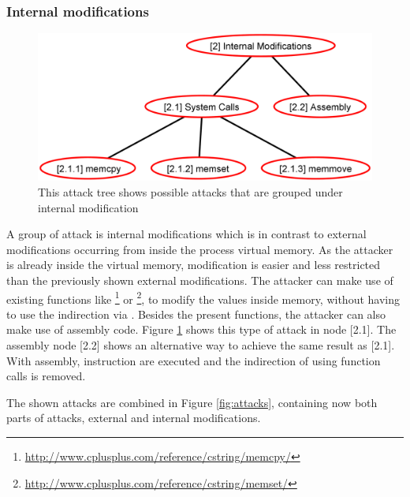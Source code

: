 \subsubsection{Internal modifications}
\label{sec:internal_modifications}
\begin{figure}[!htbp]
\centering
\includegraphics[width=\textwidth, keepaspectratio]{sections/adtrees/InternalModificationsWithoutDefenses.png}
\caption{This attack tree shows possible attacks that are grouped under internal modification}
\label{fig:attacks_internal}
\end{figure}
A group of attack is internal modifications which is in contrast to external modifications occurring from inside the process virtual memory. As the attacker is already inside the virtual memory, modification is easier and less restricted than the previously shown external modifications. The attacker can make use of existing functions like \footnote{\url{http://www.cplusplus.com/reference/cstring/memcpy/}} or \footnote{\url{http://www.cplusplus.com/reference/cstring/memset/}}, to modify the values inside memory, without having to use the indirection via . Besides the present  functions, the attacker can also make use of assembly code. Figure \ref{fig:attacks_internal} shows this type of attack in node [2.1]. The assembly node [2.2] shows an alternative way to achieve the same result as [2.1]. With assembly, instruction are executed and the indirection of using function calls is removed.  

\medskip

The shown attacks are combined in Figure \ref{fig:attacks}, containing now both parts of attacks, external and internal modifications.